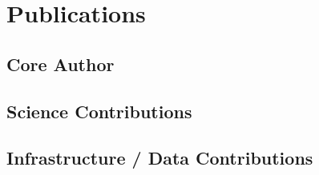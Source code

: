 

\section{Publications}


\subsection{Core Author}

\newrefcontext[sorting=ydnt]
\begin{refsection}
    \nocite{*}
    \printbibliography[heading=none, keyword={primary}]
\end{refsection}


\subsection{Science Contributions}
\begin{refsection}
	\nocite{*}
	\printbibliography[heading=none, keyword={science}]
\end{refsection}


\subsection{Infrastructure / Data Contributions}
\begin{refsection}
	\nocite{*}
	\printbibliography[heading=none, keyword={infrastructure}]
\end{refsection}



